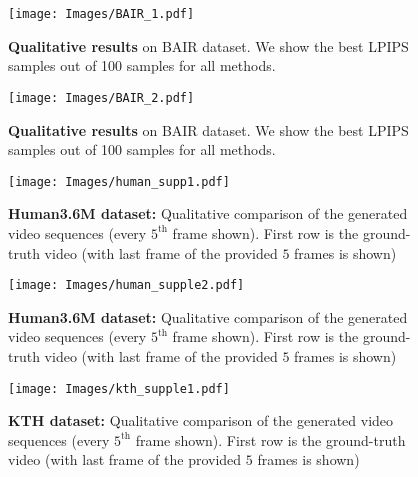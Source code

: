 \documentclass{article} \usepackage{iclr2021_conference,times}
\begin{document}
\begin{figure}[t!]
    \centering
    \begin{minipage}{.48\linewidth}
        \centering
        \texttt{[image: Images/BAIR\_1.pdf]}
        \caption{\textbf{Qualitative results} on BAIR dataset. We show the best LPIPS samples out of 100 samples for all methods.}
        \label{fig:bairsup1}
    \end{minipage}\hfill
    \begin{minipage}{0.48\linewidth}
        \centering
        \texttt{[image: Images/BAIR\_2.pdf]}
        \caption{\textbf{Qualitative results} on BAIR dataset. We show the best LPIPS samples out of 100 samples for all methods.}
        \label{fig:bairsup2}
    \end{minipage}
\end{figure}
\begin{figure}[t!]
    \centering
    \begin{minipage}{.48\linewidth}
        \centering
        \texttt{[image: Images/human\_supp1.pdf]}
        \caption{\textbf{Human3.6M dataset:} Qualitative comparison of the generated video sequences (every $5^\text{th}$ frame shown). First row is the ground-truth video (with last frame of the provided $5$ frames is shown)}
        \label{fig:humansup1}
    \end{minipage}\hfill
    \begin{minipage}{0.48\linewidth}
        \centering
        \texttt{[image: Images/human\_supple2.pdf]}
        \caption{\textbf{Human3.6M dataset:} Qualitative comparison of the generated video sequences (every $5^\text{th}$ frame shown). First row is the ground-truth video (with last frame of the provided $5$ frames is shown)}
        \label{fig:humansup2}
    \end{minipage}
\end{figure}



\clearpage
\begin{figure}[t]
    \centering
\texttt{[image: Images/kth\_supple1.pdf]}
    \caption{\textbf{KTH dataset:} Qualitative comparison of the generated video sequences (every $5^\text{th}$ frame shown). First row is the ground-truth video (with last frame of the provided $5$ frames is shown)}
    \label{fig:kthsup1}
\end{figure}
\end{document}
